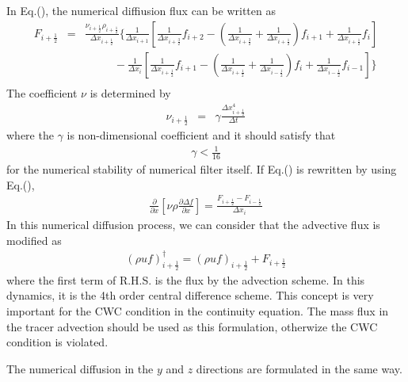 In Eq.(), the numerical diffiusion flux can be written as
{\footnotesize
\begin{eqnarray}
F_{i+\frac{1}{2}}&=&\frac{\nu_{i+\frac{1}{2}}\rho_{i+\frac{1}{2}}}{\Delta x_{i+\frac{1}{2}}}
\Bigg\{\frac{1}{\Delta x_{i+1}}\left[
\frac{1}{\Delta x_{i+\frac{3}{2}}}f_{i+2}
-\left(\frac{1}{\Delta x_{i+\frac{3}{2}}}+\frac{1}{\Delta x_{i+\frac{1}{2}}}\right)f_{i+1}
+\frac{1}{\Delta x_{i+\frac{1}{2}}}f_{i}\right]\nonumber\\
&&~~~~~~~~~~~~ -\frac{1}{\Delta x_i}\left[
\frac{1}{\Delta x_{i+\frac{1}{2}}}f_{i+1}
-\left(\frac{1}{\Delta x_{i+\frac{1}{2}}}+\frac{1}{\Delta x_{i-\frac{1}{2}}}\right)f_i
+\frac{1}{\Delta x_{i-\frac{1}{2}}}f_{i-1}\right]\Bigg\}\nonumber\\
\end{eqnarray}
}
The coefficient $\nu$ is determined by
\begin{eqnarray}
  \nu_{i+\frac{1}{2}} &=& \gamma \frac{\Delta x_{i+\frac{1}{2}}^4}{\Delta t}
\end{eqnarray}
where  the $\gamma$ is non-dimensional coefficient and it should satisfy that
\begin{eqnarray}
\gamma < \frac{1}{16}
\end{eqnarray}
for the numerical stability of numerical filter itself.
If Eq.() is rewritten by using Eq.(), 
\begin{eqnarray}
\frac{\partial }{\partial x}\left[\nu \rho \frac{\partial \Delta f}{\partial x}\right]  
=
\frac{F_{i+\frac{1}{2}}-F_{i-\frac{1}{2}}}{\Delta x_{i}}
%
%
\end{eqnarray}
In this numerical diffusion process,
we can consider that the advective flux is modified as
\begin{eqnarray}
  (\rho u f)_{i+\frac{1}{2}}^{\dagger} = (\rho u f)_{i+\frac{1}{2}}+F_{i+\frac{1}{2}}
\end{eqnarray}
where the first term of R.H.S. is the flux by the advection scheme.
In this dynamics, it is the 4th order central difference scheme.
This concept is very important for the CWC condition in the continuity equation.
The mass flux in the tracer advection should be used as this formulation, 
otherwize the CWC condition is violated.

The numerical diffusion in the $y$ and $z$ directions
are formulated in the same way.



